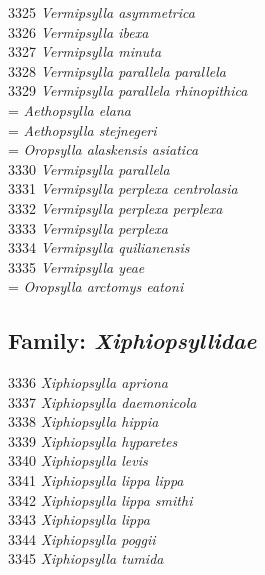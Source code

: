 \documentclass[
]{article}
\begin{document}
3325 \emph{Vermipsylla asymmetrica}\\
3326 \emph{Vermipsylla ibexa}\\
3327 \emph{Vermipsylla minuta}\\
3328 \emph{Vermipsylla parallela parallela}\\
3329 \emph{Vermipsylla parallela rhinopithica}\\
= \emph{Aethopsylla elana}\\
= \emph{Aethopsylla stejnegeri}\\
= \emph{Oropsylla alaskensis asiatica}\\
3330 \emph{Vermipsylla parallela}\\
3331 \emph{Vermipsylla perplexa centrolasia}\\
3332 \emph{Vermipsylla perplexa perplexa}\\
3333 \emph{Vermipsylla perplexa}\\
3334 \emph{Vermipsylla quilianensis}\\
3335 \emph{Vermipsylla yeae}\\
= \emph{Oropsylla arctomys eatoni}

\hypertarget{family-xiphiopsyllidae}{%
\subsection{\texorpdfstring{Family:
\emph{Xiphiopsyllidae}}{Family: Xiphiopsyllidae}}\label{family-xiphiopsyllidae}}

3336 \emph{Xiphiopsylla apriona}\\
3337 \emph{Xiphiopsylla daemonicola}\\
3338 \emph{Xiphiopsylla hippia}\\
3339 \emph{Xiphiopsylla hyparetes}\\
3340 \emph{Xiphiopsylla levis}\\
3341 \emph{Xiphiopsylla lippa lippa}\\
3342 \emph{Xiphiopsylla lippa smithi}\\
3343 \emph{Xiphiopsylla lippa}\\
3344 \emph{Xiphiopsylla poggii}\\
3345 \emph{Xiphiopsylla tumida}
\end{document}
